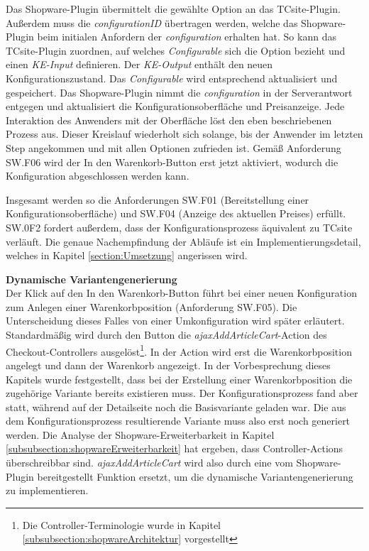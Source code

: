 \documentclass[12pt,a4paper,bibliography=totocnumbered,listof=totoc]{scrartcl}
\begin{document}
Das Shopware-Plugin übermittelt die gewählte Option an das TCsite-Plugin. Außerdem muss die \emph{configurationID} übertragen werden, welche das Shopware-Plugin beim initialen Anfordern der \emph{configuration} erhalten hat. So kann das TCsite-Plugin zuordnen, auf welches \emph{Configurable} sich die Option bezieht und einen \emph{KE-Input} definieren. Der \emph{KE-Output} enthält den neuen Konfigurationszustand. Das \emph{Configurable} wird entsprechend aktualisiert und gespeichert. Das Shopware-Plugin nimmt die \emph{configuration} in der Serverantwort entgegen und aktualisiert die Konfigurationsoberfläche und Preisanzeige. Jede Interaktion des Anwenders mit der Oberfläche löst den eben beschriebenen Prozess aus. Dieser Kreislauf wiederholt sich solange, bis der Anwender im letzten Step angekommen und mit allen Optionen zufrieden ist. Gemäß Anforderung SW.F06 wird der \glqq In den Warenkorb\grqq{}-Button erst jetzt aktiviert, wodurch die Konfiguration abgeschlossen werden kann.

Insgesamt werden so die Anforderungen SW.F01 (Bereitstellung einer Konfigurationsoberfläche) und SW.F04 (Anzeige des aktuellen Preises) erfüllt. SW.0F2 fordert außerdem, dass der Konfigurationsprozess äquivalent zu TCsite verläuft. Die genaue Nachempfindung der Abläufe ist ein Implementierungsdetail, welches in Kapitel \ref{section:Umsetzung} angerissen wird.

\textbf{Dynamische Variantengenerierung}\\
Der Klick auf den \glqq In den Warenkorb\grqq{}-Button führt bei einer neuen Konfiguration zum Anlegen einer Warenkorbposition (Anforderung SW.F05). Die Unterscheidung dieses Falles von einer Umkonfiguration wird später erläutert.  Standardmäßig wird durch den Button die \emph{ajaxAddArticleCart}-Action des Checkout-Controllers ausgelöst\footnote{Die Controller-Terminologie wurde in Kapitel \ref{subsubsection:shopwareArchitektur} vorgestellt}. In der Action wird erst die Warenkorbposition angelegt und dann der Warenkorb angezeigt. In der Vorbesprechung dieses Kapitels wurde festgestellt, dass bei der Erstellung einer Warenkorbposition die zugehörige Variante bereits existieren muss. Der Konfigurationsprozess fand aber statt, während auf der Detailseite noch die Basisvariante geladen war. Die aus dem Konfigurationsprozess resultierende Variante muss also erst noch generiert werden. Die Analyse der Shopware-Erweiterbarkeit in Kapitel \ref{subsubsection:shopwareErweiterbarkeit} hat ergeben, dass Controller-Actions überschreibbar sind. \emph{ajaxAddArticleCart} wird also durch eine vom Shopware-Plugin bereitgestellt Funktion ersetzt, um die dynamische Variantengenerierung zu implementieren.
\end{document}
